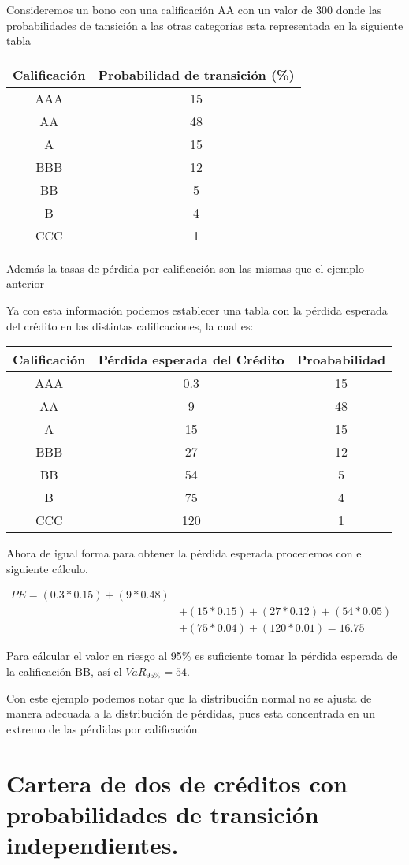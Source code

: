\documentclass[
  12pt,
]{krantz}
\theoremstyle{definition}
\theoremstyle{definition}
\theoremstyle{definition}
\theoremstyle{remark}
\begin{document}
Consideremos un bono con una calificación AA con un valor de 300 donde las probabilidades de tansición a las otras categorías esta representada en la siguiente tabla

\begin{longtable}[]{@{}cc@{}}
\toprule
Calificación & Probabilidad de transición (\%)\tabularnewline
\midrule
\endhead
AAA & 15\tabularnewline
AA & 48\tabularnewline
A & 15\tabularnewline
BBB & 12\tabularnewline
BB & 5\tabularnewline
B & 4\tabularnewline
CCC & 1\tabularnewline
\bottomrule
\end{longtable}

Además la tasas de pérdida por calificación son las mismas que el ejemplo anterior

Ya con esta información podemos establecer una tabla con la pérdida esperada del crédito en las distintas calificaciones, la cual es:

\begin{longtable}[]{@{}ccc@{}}
\toprule
Calificación & Pérdida esperada del Crédito & Proababilidad\tabularnewline
\midrule
\endhead
AAA & 0.3 & 15\tabularnewline
AA & 9 & 48\tabularnewline
A & 15 & 15\tabularnewline
BBB & 27 & 12\tabularnewline
BB & 54 & 5\tabularnewline
B & 75 & 4\tabularnewline
CCC & 120 & 1\tabularnewline
\bottomrule
\end{longtable}

Ahora de igual forma para obtener la pérdida esperada procedemos con el siguiente cálculo.

\begin{align*} 
PE = (0.3*0.15)+(9*0.48)& \\
&+(15*0.15)+(27*0.12)+(54*0.05)&\\
&+(75*0.04) +(120*0.01)=16.75
\end{align*}

Para cálcular el valor en riesgo al 95\% es suficiente tomar la pérdida esperada de la calificación BB, así el \(VaR_{95\%}=54\).

Con este ejemplo podemos notar que la distribución normal no se ajusta de manera adecuada a la distribución de pérdidas, pues esta concentrada en un extremo de las pérdidas por calificación.

\hypertarget{cartera-de-dos-de-creditos-con-probabilidades-de-transicion-independientes.}{%
\section{Cartera de dos de créditos con probabilidades de transición independientes.}\label{cartera-de-dos-de-creditos-con-probabilidades-de-transicion-independientes.}}
\end{document}
